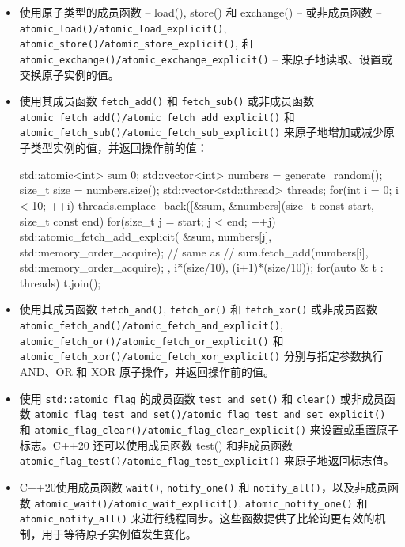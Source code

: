 \begin{itemize}
\item
使用原子类型的成员函数 – load(), store() 和 exchange() – 或非成员函数 – \verb|atomic_load()/atomic_load_explicit()|, \verb|atomic_store()/atomic_store_explicit()|, 和 \verb|atomic_exchange()/atomic_exchange_explicit()| – 来原子地读取、设置或交换原子实例的值。

\item
使用其成员函数 \verb|fetch_add()| 和 \verb|fetch_sub()| 或非成员函数 \verb|atomic_fetch_add()/atomic_fetch_add_explicit()| 和 \verb|atomic_fetch_sub()/atomic_fetch_sub_explicit()| 来原子地增加或减少原子类型实例的值，并返回操作前的值：

\begin{cpp}
std::atomic<int> sum {0};
std::vector<int> numbers = generate_random();
size_t size = numbers.size();
std::vector<std::thread> threads;
for(int i = 0; i < 10; ++i)
{
    threads.emplace_back([&sum, &numbers](size_t const start,
    size_t const end) {
        for(size_t j = start; j < end; ++j)
        {
            std::atomic_fetch_add_explicit(
                &sum, numbers[j],
                std::memory_order_acquire);
            // same as
            // sum.fetch_add(numbers[i], std::memory_order_acquire);
    }},
    i*(size/10),
    (i+1)*(size/10));
}
for(auto & t : threads) t.join();
\end{cpp}

\item
使用其成员函数 \verb|fetch_and()|, \verb|fetch_or()| 和 \verb|fetch_xor()| 或非成员函数 \verb|atomic_fetch_and()/atomic_fetch_and_explicit()|, \verb|atomic_fetch_or()/atomic_fetch_or_explicit()| 和\\ \verb|atomic_fetch_xor()/atomic_fetch_xor_explicit()| 分别与指定参数执行 AND、OR 和 XOR 原子操作，并返回操作前的值。

\item
使用 \verb|std::atomic_flag| 的成员函数 \verb|test_and_set()| 和 \verb|clear()| 或非成员函数 \verb|atomic_flag_test_and_set()/atomic_flag_test_and_set_explicit()| 和 \verb|atomic_flag_clear()/atomic_flag_clear_explicit()| 来设置或重置原子标志。C++20 还可以使用成员函数 test() 和非成员函数 \verb|atomic_flag_test()/atomic_flag_test_explicit()| 来原子地返回标志值。

\item
C++20使用成员函数 \verb|wait()|, \verb|notify_one()| 和 \verb|notify_all()|，以及非成员函数 \verb|atomic_wait()/atomic_wait_explicit()|, \verb|atomic_notify_one()| 和 \verb|atomic_notify_all()| 来进行线程同步。这些函数提供了比轮询更有效的机制，用于等待原子实例值发生变化。
\end{itemize}

